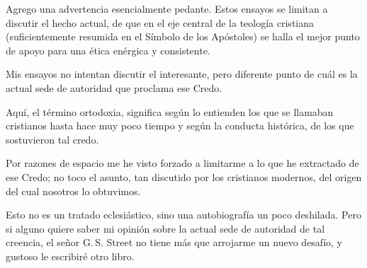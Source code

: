 Agrego una advertencia esencialmente pedante. Estos ensayos se limitan a discutir el hecho actual,
de que en el eje central de la teología cristiana (suficientemente resumida en el Símbolo de los Apóstoles)
se halla el mejor punto de apoyo para una ética enérgica y consistente.

Mis ensayos no intentan discutir el interesante, pero diferente punto de cuál es la actual sede de
autoridad que proclama ese Credo.

Aquí, el término ortodoxia, significa  según lo entienden los que se
llamaban cristianos hasta hace muy poco tiempo y según la conducta histórica, de los que sostuvieron tal
credo.

Por razones de espacio me he visto forzado a limitarme a lo que he extractado de ese Credo; no toco
el asunto, tan discutido por los cristianos modernos, del origen del cual nosotros lo obtuvimos.

Esto no es un tratado eclesiástico, sino una autobiografía un poco deshilada.
Pero si alguno quiere saber mi opinión sobre la actual sede de autoridad de tal creencia, el señor G.\,S. Street no tiene más que arrojarme un nuevo desafío, y gustoso le escribiré otro libro.
\finalCapituloOrnamento

